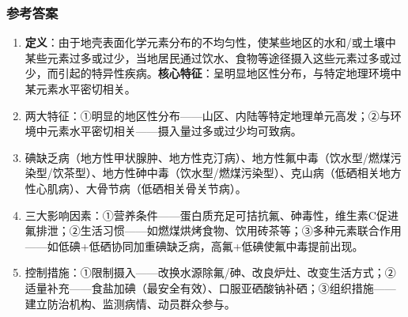 \subsubsection*{参考答案}
\begin{enumerate}[leftmargin=*, itemsep=5pt]
    \item \textbf{定义}：由于地壳表面化学元素分布的不均匀性，使某些地区的水和/或土壤中某些元素过多或过少，当地居民通过饮水、食物等途径摄入这些元素过多或过少，而引起的特异性疾病。\textbf{核心特征}：呈明显地区性分布，与特定地理环境中某元素水平密切相关。
    \item 两大特征：①明显的地区性分布——山区、内陆等特定地理单元高发；②与环境中元素水平密切相关——摄入量过多或过少均可致病。
    \item 碘缺乏病（地方性甲状腺肿、地方性克汀病）、地方性氟中毒（饮水型/燃煤污染型/饮茶型）、地方性砷中毒（饮水型/燃煤污染型）、克山病（低硒相关地方性心肌病）、大骨节病（低硒相关骨关节病）。
    \item 三大影响因素：①营养条件——蛋白质充足可拮抗氟、砷毒性，维生素C促进氟排泄；②生活习惯——如燃煤烘烤食物、饮用砖茶等；③多种元素联合作用——如低碘+低硒协同加重碘缺乏病，高氟+低碘使氟中毒提前出现。
    \item 控制措施：①限制摄入——改换水源除氟/砷、改良炉灶、改变生活方式；②适量补充——食盐加碘（最安全有效）、口服亚硒酸钠补硒；③组织措施——建立防治机构、监测病情、动员群众参与。
\end{enumerate}

\newpage

\newpage